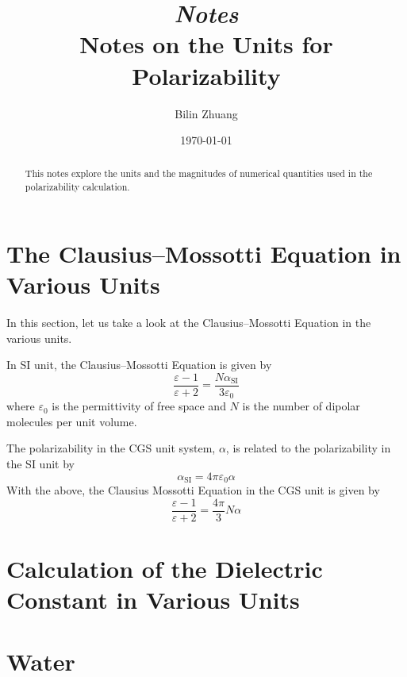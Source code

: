 \documentclass[aps, 12pt, amsmath, amssymb, onecolumn, notitlepage, nofootinbib]{revtex4-1}
\begin{document}

\title{{\small\it{Notes}}\\ Notes on the Units for Polarizability }
\author{Bilin Zhuang}
\date{\today}



\begin{abstract}

This notes explore the units and the magnitudes of numerical quantities used in the polarizability calculation.
	
\end{abstract}

\maketitle
\section{The Clausius--Mossotti Equation in Various Units}

In this section, let us take a look at the Clausius--Mossotti Equation in the various units.

In SI unit, the Clausius--Mossotti Equation is given by
\begin{equation}
\frac{\varepsilon-1}{\varepsilon+2} = \frac{N\alpha_\text{SI}}{3\varepsilon_0}
\end{equation}
where $\varepsilon_0$ is the permittivity of free space and $N$ is the number of dipolar molecules per unit volume.

The polarizability in the CGS unit system, $\alpha$, is related to the polarizability in the SI unit by
\begin{equation}
\alpha_\text{SI} = 4\pi\varepsilon_0 \alpha
\end{equation}
With the above, the Clausius Mossotti Equation in the CGS unit is given by
\begin{equation}
\frac{\varepsilon-1}{\varepsilon+2} = \frac{4 \pi}{3} N \alpha
\end{equation}

 
\section{Calculation of the Dielectric Constant in Various Units}

\section{Water}
\end{document}
